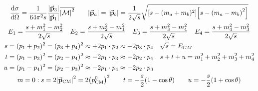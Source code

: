 \begin{gather*}
        \dv{\sigma}{\Omega} = \frac{1}{64\pi^2s}\frac{\abs{\va{p}_{3}}}{\abs{\va{p}_{1}}}\overline{\abs{\operatorname{\mathcal{M}}}^2}
        \qquad
        \abs{\va{p}_a} = \abs{\va{p}_b} = \frac{1}{2\sqrt{s}}\sqrt{\qty[s - (m_a+m_b)^2]\qty[s - \qty(m_a-m_b)^2]}
        \\
        E_1 = \frac{s + m_1^2 - m_2^2}{2\sqrt{s}}
        \quad
        E_2 = \frac{s + m_2^2 - m_1^2}{2\sqrt{s}}
        \quad
        E_3 = \frac{s + m_3^2 - m_4^2}{2\sqrt{s}}
        \quad
        E_4 = \frac{s + m_4^2 - m_3^2}{2\sqrt{s}}
        \\
        \begin{aligned}
                s
                &= (p_1 + p_2)^2 = (p_3 + p_4)^2
                \approx +2p_1\cdot p_2 \approx +2p_3\cdot p_4
                &&
                \sqrt{s} = E_{CM}
                \\
                t
                &= (p_1 - p_3)^2 = (p_2 - p_4)^2
                \approx -2p_1\cdot p_3 \approx -2p_2\cdot p_4
                &&
                s + t + u = m_1^2 + m_2^2 + m_3^2 + m_4^2
                \\
                u
                &= (p_1 - p_4)^2 = (p_2 - p_3)^2
                \approx -2p_1\cdot p_4 \approx -2p_2\cdot p_3
                \\
        \end{aligned}
        \\
        m=0
        :
        s
        = 2\abs{\va{p}_{\mathrm{CM}}}^2
        = 2\qty(p^0_{\mathrm{CM}})^2
        \qquad
        t = -\frac{s}{2}\qty(1 - \cos\theta)
        \qquad
        u = -\frac{s}{2}\qty(1 + \cos\theta)
\end{gather*}
